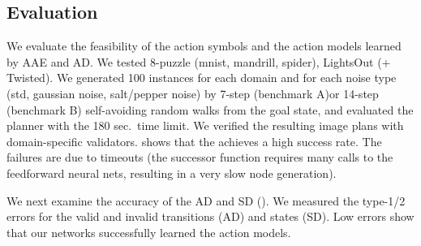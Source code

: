 \documentclass[11pt]{article}
\begin{document}





\subsection{Evaluation}

\label{sec:ama2-experiments}

We evaluate the feasibility of the action symbols and the action models learned by AAE and AD.
We tested 8-puzzle (mnist, mandrill, spider), LightsOut (+ Twisted). %
We generated 100 instances for each domain and for each noise type (std, gaussian noise, salt/pepper noise)
 by  7-step (benchmark A)or  14-step (benchmark B) self-avoiding random walks from the goal state,
and evaluated the planner with the 180 sec.\ time limit.
We verified the resulting image plans with domain-specific validators.
 shows that the \latentplanner achieves a high success rate.
The failures are due to timeouts
(the successor function requires many calls to the feedforward neural nets,
 resulting in a very slow node generation).

We next examine the accuracy of the AD and SD ().
We measured the type-1/2 errors for the valid and invalid transitions (AD) and states (SD).
Low errors show that our networks successfully learned the action models.
\end{document}
